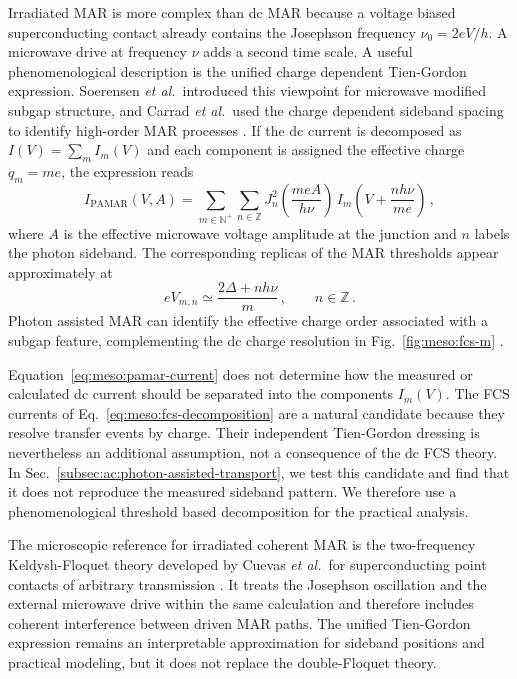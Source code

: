             Irradiated MAR is more complex than dc MAR because a voltage biased superconducting contact already contains the Josephson frequency $\nu_0=2eV/h$. A microwave drive at frequency $\nu$ adds a second time scale. A useful phenomenological description is the unified charge dependent Tien-Gordon expression. Soerensen \textit{et al.}~introduced this viewpoint for microwave modified subgap structure, and Carrad \textit{et al.}~used the charge dependent sideband spacing to identify high-order MAR processes \cite{soerensen_microwave_1974,carrad_photon-assisted_2022}. If the dc current is decomposed as $I(V)=\sum_m I_m(V)$ and each component is assigned the effective charge $q_m=me$, the expression reads
            \begin{equation}
                I_\mathrm{PAMAR}(V,A)
                =
                \sum_{m\in\mathbb{N}^+}\sum_{n\in\mathbb{Z}}
                J_n^2\left(\frac{meA}{h\nu}\right)\,
                I_m\!\left(V+\frac{nh\nu}{me}\right)\,,
                \label{eq:meso:pamar-current}
            \end{equation}
            where $A$ is the effective microwave voltage amplitude at the junction and $n$ labels the photon sideband. The corresponding replicas of the MAR thresholds appear approximately at
            \begin{equation}
                eV_{m,n}\simeq\frac{2\Delta+nh\nu}{m}\,,
                \qquad n\in\mathbb{Z}\,.
            \end{equation}
            Photon assisted MAR can identify the effective charge order associated with a subgap feature, complementing the dc charge resolution in Fig.~\ref{fig:meso:fcs-m} \cite{soerensen_microwave_1974,carrad_photon-assisted_2022}.

            Equation~\eqref{eq:meso:pamar-current} does not determine how the measured or calculated dc current should be separated into the components $I_m(V)$. The FCS currents of Eq.~\eqref{eq:meso:fcs-decomposition} are a natural candidate because they resolve transfer events by charge. Their independent Tien-Gordon dressing is nevertheless an additional assumption, not a consequence of the dc FCS theory. In Sec.~\ref{subsec:ac:photon-assisted-transport}, we test this candidate and find that it does not reproduce the measured sideband pattern. We therefore use a phenomenological threshold based decomposition for the practical analysis.

            The microscopic reference for irradiated coherent MAR is the two-frequency Keldysh-Floquet theory developed by Cuevas \textit{et al.}~for superconducting point contacts of arbitrary transmission \cite{cuevas_subharmonic_2002}. It treats the Josephson oscillation and the external microwave drive within the same calculation and therefore includes coherent interference between driven MAR paths. The unified Tien-Gordon expression remains an interpretable approximation for sideband positions and practical modeling, but it does not replace the double-Floquet theory.

